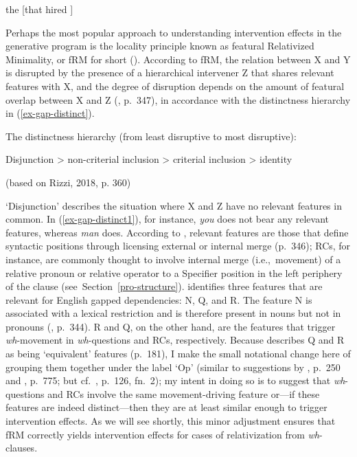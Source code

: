 \ex 
the  [that  hired ] \label{ex-gap-config}
\vspace{12pt}
\xe 

Perhaps the most popular approach to understanding intervention effects in the generative program is the locality principle known as featural Relativized Minimality, or fRM for short (\cite{rizzi2004,rizzi2013,rizzi2018}). According to fRM, the relation between X and Y is disrupted by the presence of a hierarchical intervener Z that shares relevant features with X, and the degree of disruption depends on the amount of featural overlap between X and Z (\cite{rizzi2018}, p.~347), in accordance with the distinctness hierarchy in (\ref{ex-gap-distinct}).

\ex 
The distinctness hierarchy (from least disruptive to most disruptive):\par\nobreak\vspace{5pt}
Disjunction > non-criterial inclusion > criterial inclusion > identity\par\nobreak\vspace{5pt}
\hfill (based on Rizzi, 2018, p. 360)\label{ex-gap-distinct}
\xe 

`Disjunction' describes the situation where X and Z have no relevant features in common. In (\ref{ex-gap-distinct1}), for instance, \textit{you} does not bear any relevant features, whereas \textit{man} does. According to \textcite{rizzi2018}, relevant features are those that define syntactic positions through licensing external or internal merge (p.~346); RCs, for instance, are commonly thought to involve internal merge (i.e.,~movement) of a relative pronoun or relative operator to a Specifier position in the left periphery of the clause (see~Section~\ref{pro-structure}). \textcite{rizzi2013} identifies three features that are relevant for English gapped dependencies: N, Q, and R. The feature N is associated with a lexical restriction and is therefore present in nouns but not in pronouns (\cite{rizzi2018}, p.~344). R and Q, on the other hand, are the features that trigger \textit{wh}-movement in \textit{wh}-questions and RCs, respectively. Because \textcite{rizzi2013} describes Q and R as being `equivalent' features (p.~181), I make the small notational change here of grouping them together under the label `Op' (similar to suggestions by \cite{abels2012}, p.~250 and \cite{kush.etal2018}, p.~775; but cf.~\cite{rizzi2006}, p.~126, fn.~2); my intent in doing so is to suggest that \textit{wh}-questions and RCs involve the same movement-driving feature or---if these features are indeed distinct---then they are at least similar enough to trigger intervention effects. As we will see shortly, this minor adjustment ensures that fRM correctly yields intervention effects for cases of relativization from \textit{wh}-clauses.

